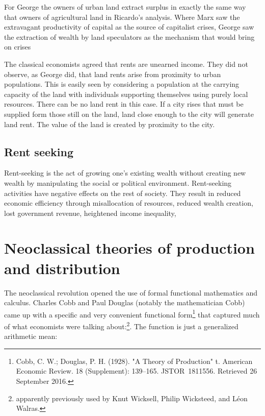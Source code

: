 For George the owners of urban land extract surplus in exactly the same way that owners of agricultural land in Ricardo's analysis. Where Marx saw  the extravagant productivity of capital  as the source of capitalist crises, George saw the extraction of wealth by land speculators as the mechanism that would bring on crises


The classical economists agreed that rents are unearned income. They did not observe, as George did, that land rents arise from proximity to urban populations. This is easily seen by considering a population at the carrying capacity of the land with individuals supporting themselves using purely local resources. There can be no land rent in this case. If a city rises that must be supplied form those still on the land, land close enough to the city will generate land rent. The value of the land is created by proximity to the city.


\subsection{Rent seeking}
  Rent-seeking is the act of growing one's existing wealth without creating new wealth by manipulating the social or political environment. Rent-seeking activities have negative effects on the rest of society. They result in reduced economic efficiency through misallocation of resources, reduced wealth creation, lost government revenue, heightened income inequality,
  
\section{Neoclassical theories of production and distribution}
 
 The neoclassical revolution opened the use of formal functional mathematics and calculus.  Charles Cobb and Paul Douglas (notably the mathematician Cobb) came up with a specific and very convenient functional form\footnote{Cobb, C. W.; Douglas, P. H. (1928). "A Theory of Production" t. American Economic Review. 18 (Supplement): 139–165. JSTOR 1811556. Retrieved 26 September 2016.} that captured much of what economists were talking about:\footnote {apparently previously used by Knut Wicksell, Philip Wicksteed, and L\'eon Walras.}. The function is just a generalized arithmetic mean:
 
